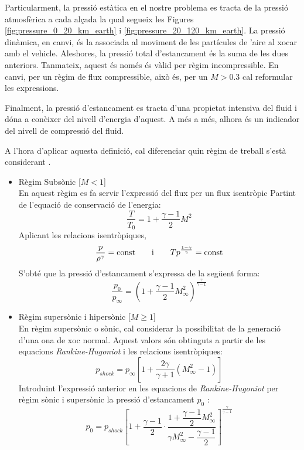 Particularment, la pressió estàtica en el nostre problema es tracta de la pressió atmosfèrica a cada alçada la qual segueix les Figures \ref{fig:pressure_0_20_km_earth} i \ref{fig:pressure_20_120_km_earth}. La pressió dinàmica, en canvi, és la associada al moviment de les partícules de 'aire al xocar amb el vehicle. Aleshores, la pressió total d'estancament és la suma de les dues anteriors. Tanmateix, aquest és només és vàlid per règim incompressible. En canvi, per un règim de flux compressible, això és, per un $M>0.3$ cal reformular les expressions. 

Finalment, la pressió d'estancament es tracta d'una propietat intensiva del fluid i dóna a conèixer del nivell d'energia d'aquest. A més a més, alhora és un indicador del nivell de compressió del fluid.

A l'hora d'aplicar aquesta definició, cal diferenciar quin règim de treball s'està considerant \cite{cumpsty}.
\begin{itemize}
    \item Règim Subsònic [$M<1$] \\
    En aquest règim es fa servir l'expressió del flux per un flux isentròpic
    Partint de l'equació de conservació de l'energia:
    \begin{equation}
        \frac{T}{T_0} = 1 + \frac{\gamma - 1}{2} M^2
    \end{equation}
    Aplicant les relacions isentròpiques,
    \begin{equation*}
        \frac{p}{\rho^\gamma} = \mathrm{const} 
        \hspace{7mm} \text{i} \hspace{7mm} 
        T p^{\frac{1 - \gamma}{\gamma}} = \mathrm{const}
    \end{equation*}
    S'obté que la pressió d'estancament s'expressa de la següent forma:
    \begin{equation}
        \frac{p_0}{p_\infty} = \left( 1 + \frac{\gamma - 1}{2} M_\infty^2\right)^\frac{\gamma}{\gamma - 1}
    \end{equation}
    
    \item Règim supersònic i hipersònic [$M\geq 1$] \\
    En règim supersònic o sònic, cal considerar la possibilitat de la generació d'una ona de xoc normal. Aquest valors són obtinguts a partir de les equacions \textit{Rankine-Hugoniot} i les relacions isentròpiques:
    \begin{equation} \label{eq:rankine_hugoniot_p_shock}  
        p_{shock} = p_\infty \left[ 1 + \frac{2 \gamma}{\gamma  + 1} (M_\infty^2 - 1) \right]
    \end{equation}
    Introduint l'expressió anterior en les equacions de \textit{Rankine-Hugoniot} per règim sònic i supersònic la pressió d'estancament $p_0$ \cite{gallais}:
    \begin{equation} \label{eq:rankine_hugoniot_p_0}
        p_0 = p_{shock} \left[ 1 + \frac{\gamma - 1}{2} \cdot \frac{1 + \dfrac{\gamma-1}{2} M_\infty^2}{\gamma M_\infty^2 - \dfrac{\gamma-1}{2}} \right]^\frac{\gamma}{\gamma-1}
    \end{equation}
\end{itemize}

